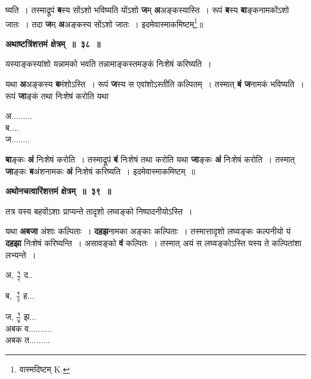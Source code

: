 \documentclass[11pt, openany]{book}
\begin{document}
\noindent ष्यति~। तस्माद्रूपं \textbf{ब}स्य सोंऽशो भविष्यति योंऽशो \textbf{ज}म् \textbf{अ}अङ्कस्यास्ति~। रूपं \textbf{ब}स्य \textbf{बा}ङ्कनामकोंऽशो जातः~। तदा \textbf{ज}म् \textbf{अ}अङ्कस्य सोंऽशो जातः~। इदमेवास्माकमिष्टम्\renewcommand{\thefootnote}{२}\footnote{वास्मदिष्टम् {\en K.}}\;॥
\vspace{2mm}

\begin{center}
\textbf{\large अथाष्टत्रिंशत्तमं क्षेत्रम्~॥~३८~॥}
\end{center}

{\ab यस्याङ्कस्यांशो यन्नामको भवति तन्नामाङ्कस्तमङ्कं निःशेषं करिष्यति~। }

\begin{flushleft}
\begin{minipage}[t]{0.75\textwidth}
\hspace{4mm} यथा \textbf{अ}अङ्कस्य \textbf{ब}मंशोऽस्ति~। रूपं \textbf{ज}स्य स एवांशोऽस्तीति कल्पितम्~। तस्मात् \textbf{बं ज}नामकं भविष्यति~। रूपं \textbf{जा}ङ्कं तथा निःशेषं करोति यथा 
\end{minipage} 
\hfill
\begin{minipage}[t]{0.15\textwidth}
अ......... \\
ब.... \\
ज........
\end{minipage}
\end{flushleft}

\newpage
\noindent \textbf{बा}ङ्कः \textbf{अं} निःशेषं करोति~। तस्माद्रूपं \textbf{बं} निःशेषं तथा करोति यथा \textbf{जा}ङ्कः \textbf{अं} निःशेषं करोति~। तस्मात् \textbf{जा}ङ्कः \textbf{ब}अंशनामकः \textbf{अं} निःशेषं करिष्यति~। इदमेवास्माकमिष्टम्~॥ 
\vspace{2mm}

\begin{center}
\textbf{\large अथोनचत्वारिंशत्तमं क्षेत्रम्~॥~३९~॥}
\end{center}

 {\ab तत्र यस्य बहवोंऽशाः प्राप्यन्ते तादृशो लघ्वङ्को निष्पादनीयोऽस्ति~। }

\begin{flushleft}
\begin{minipage}[t]{0.65\textwidth}
\hspace{4mm} यथा \textbf{अबजा} अंशाः कल्पिताः~। \textbf{दहझ}नामका अङ्काः कल्पिताः~। तस्मात्तादृशो लघ्वङ्कः कल्पनीयो यं \textbf{दहझा} निःशेषं करिष्यन्ति~। असावङ्को \textbf{वं} कल्पितः~। तस्मात् अयं स लघ्वङ्कोऽस्ति यस्य ते कल्पितांशा लभ्यन्ते~।
\end{minipage} 
\hfill
\begin{minipage}[t]{0.25\textwidth}
अ, $\frac{१}{२}$ द.. \\
\vspace{-4mm}

ब, \,$\frac{१}{२}$ ह... \\
\vspace{-4mm}

ज, $\frac{१}{४}$ झ... \\
{\color{white}अबक} व.......... \\
{\color{white}अबक} त.........
\end{minipage}
\end{flushleft}
\vspace{-5mm}
\end{document}
